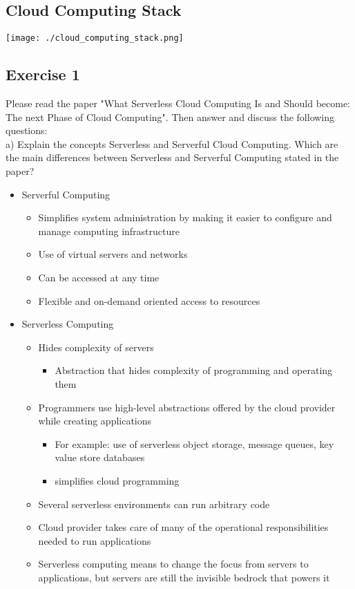 \documentclass{article}
\begin{document}
\subsection{Cloud Computing Stack}
\texttt{[image: ./cloud\_computing\_stack.png]}
\subsection{Exercise 1}
Please read the paper "What Serverless Cloud Computing Is and Should become: The next Phase of Cloud Computing". Then answer and discuss the following questions:\\
a) Explain the concepts Serverless and Serverful Cloud Computing. Which are the main differences between Serverless and Serverful Computing stated in the paper?
\begin{itemize}
    \item Serverful Computing
          \begin{itemize}
              \item Simplifies system administration by making it easier to configure and manage computing infrastructure
              \item Use of virtual servers and networks
              \item Can be accessed at any time
              \item Flexible and on-demand oriented access to resources
          \end{itemize}
    \item Serverless Computing
          \begin{itemize}
              \item Hides complexity of servers
                    \begin{itemize}
                        \item Abstraction that hides complexity of programming and operating them
                    \end{itemize}
              \item Programmers use high-level abstractions offered by the cloud provider while creating applications
                    \begin{itemize}
                        \item For example: use of serverless object storage, message queues, key value store databases
                        \item simplifies cloud programming
                    \end{itemize}
              \item Several serverless environments can run arbitrary code
              \item Cloud provider takes care of many of the operational responsibilities needed to run applications
              \item Serverless computing means to change the focus from servers to applications, but servers are still the invisible bedrock that powers it
          \end{itemize}
\end{itemize}
\end{document}
